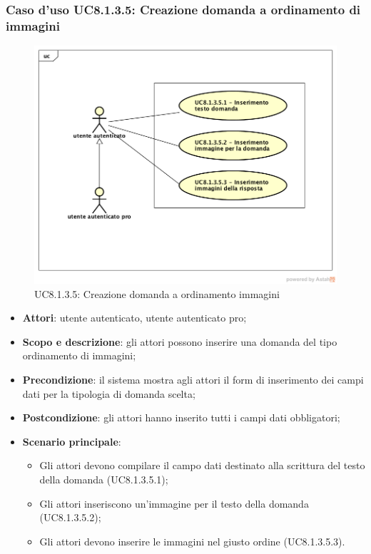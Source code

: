 \subsubsection{Caso d’uso UC8.1.3.5: Creazione domanda a ordinamento di immagini}
\label{UC8.1.3.5}
	\begin{figure}[h]
		\centering
			\includegraphics[scale=0.45,keepaspectratio]{UML/UC8_1_3_5.png}
		\caption{UC8.1.3.5: Creazione domanda a ordinamento immagini}
	\end{figure}
\begin{itemize}
	\item\textbf{Attori}: utente autenticato, utente autenticato pro;
	\item\textbf{Scopo e descrizione}: gli attori possono inserire una domanda del tipo ordinamento di immagini;
	\item\textbf{Precondizione}: il sistema mostra agli attori il form di inserimento dei campi dati per la tipologia di domanda scelta; 
	\item \textbf{Postcondizione}: gli attori hanno inserito tutti i campi dati obbligatori;
	\item\textbf{Scenario principale}:
	\begin{itemize}
		\item Gli attori devono compilare il campo dati destinato alla scrittura del testo della domanda (UC8.1.3.5.1);
		\item Gli attori inseriscono un'immagine per il testo della domanda (UC8.1.3.5.2);
		\item Gli attori devono inserire le immagini nel giusto ordine (UC8.1.3.5.3).
	\end{itemize}
\end{itemize}


